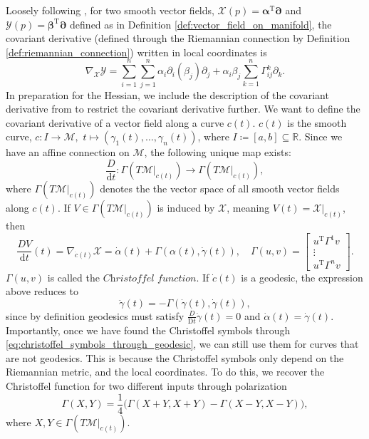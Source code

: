 Loosely following \cite[Appendix~A]{JensenZimmermann2024}, for two smooth vector fields, $\mathcal{X}(p)=\boldsymbol{\alpha}^{\mathrm{T}}\boldsymbol{\partial}$ and $\mathcal{Y}(p)=\boldsymbol{\beta}^{\mathrm{T}}\boldsymbol{\partial}$ defined as in Definition \ref{def:vector_field_on_manifold}, the covariant derivative (defined through the Riemannian connection by Definition \ref{def:riemannian_connection}) written in local coordinates is
\begin{equation*}
    \nabla_{\mathcal{X}}\mathcal{Y}=\sum\limits_{i=1}^{n}\sum\limits_{j=1}^{n}\alpha_{i}\partial_{i}(\beta_{j})\partial_{j}+\alpha_{i}\beta_{j}\sum\limits_{k=1}^{n}\Gamma_{ij}^{k}\partial_{k}.
\end{equation*}
In preparation for the Hessian, we include the description of the covariant derivative from \cite[p.~96]{Tu2017} to restrict the covariant derivative further. We want to define the covariant derivative of a vector field along a curve $c(t)$. $c(t)$ is the smooth curve, $c\colon I\xrightarrow{}\mathcal{M},$ $t\mapsto(\gamma_{1}(t), \dots, \gamma_{n}(t))$, where $I \coloneqq [a,b]\subseteq \mathbb{R}$. Since we have an affine connection on $\mathcal{M}$, the following unique map exists:
\begin{equation*}
    \frac{D}{\mathrm{d}t}\colon \Gamma(T \mathcal{M}|_{c(t)})\xrightarrow{}\Gamma(T \mathcal{M}|_{c(t)}),
\end{equation*}
where $\Gamma(T \mathcal{M}|_{c(t)})$ denotes the the vector space of all smooth vector fields along $c(t)$. If $V\in \Gamma(T \mathcal{M}|_{c(t)})$ is induced by $\mathcal{X}$, meaning $V(t)=\mathcal{X}|_{c(t)}$, then
\begin{equation*}
    \frac{DV}{\mathrm{d}t}(t)=\nabla_{\dot{c}(t)}\mathcal{X}=\dot{\alpha}(t)+\Gamma(\alpha(t), \dot{\gamma}(t)),\quad \Gamma(u,v)=\begin{bmatrix}u ^{\mathrm{T}}\Gamma^{1}v \\ \vdots \\ u ^{\mathrm{T}}\Gamma^{n}v\end{bmatrix}.
\end{equation*}
$\Gamma(u,v)$ is called the $\textit{Christoffel function}$. If $\dot{c}(t)$ is a geodesic, the expression above reduces to 
\begin{equation}\label{eq:christoffel_symbols_through_geodesic}
    \ddot{\gamma}(t)=-\Gamma(\dot{\gamma}(t),\dot{\gamma}(t)),
\end{equation}
since by definition geodesics must satisfy $\tfrac{D}{\mathrm{D}t}\dot{\gamma}(t)=0$ and $\dot{\alpha}(t)=\dot{\gamma}(t)$. Importantly, once we have found the Christoffel symbols through \eqref{eq:christoffel_symbols_through_geodesic}, we can still use them for curves that are not geodesics. This is because the Christoffel symbols only depend on the Riemannian metric, and the local coordinates. To do this, we recover the Christoffel function for two different inputs through polarization \cite[p.~312]{Edelman1998} 
\begin{equation*}
    \Gamma(X,Y)=\frac{1}{4}\big(\Gamma(X+Y,X+Y)-\Gamma(X-Y,X-Y)\big),
\end{equation*}
where $X,Y\in \Gamma(T \mathcal{M}|_{c(t)})$. 

